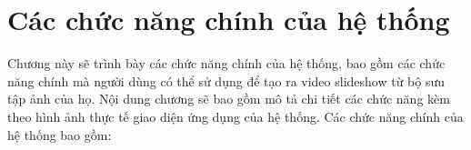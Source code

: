 \section{Các chức năng chính của hệ thống}

Chương này sẽ trình bày các chức năng chính của hệ thống, bao gồm các chức năng chính mà người dùng có thể sử dụng để tạo ra video slideshow từ bộ sưu tập ảnh của họ. Nội dung chương sẽ bao gồm mô tả chi tiết các chức năng kèm theo hình ảnh thực tế giao diện ứng dụng của hệ thống. Các chức năng chính của hệ thống bao gồm:











